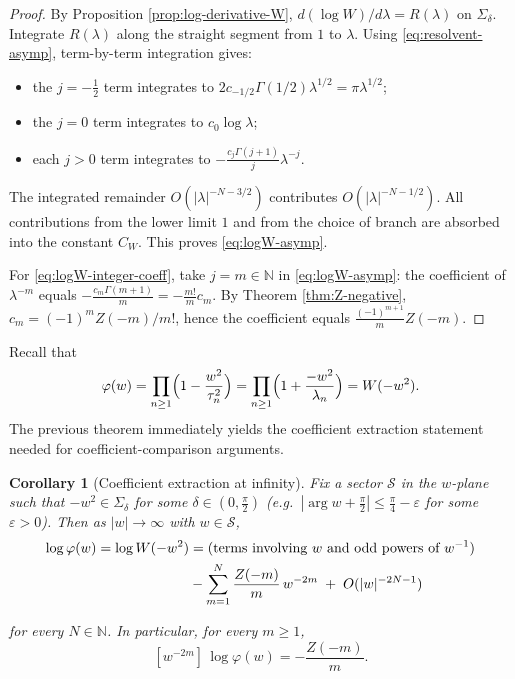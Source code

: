 \documentclass[11pt,letterpaper]{amsart}
\numberwithin{equation}{section}
\newtheorem{corollary}[theorem]{Corollary}
\theoremstyle{definition}
\newcommand{\N}{\mathbb{N}}
\begin{document}
\begin{proof}
By Proposition \ref{prop:log-derivative-W}, $d(\log W)/d\lambda=R(\lambda)$ on $\Sigma_\delta$.
Integrate $R(\lambda)$ along the straight segment from $1$ to $\lambda$.
Using \eqref{eq:resolvent-asymp}, term-by-term integration gives:
\begin{itemize}[leftmargin=2.5em]
\item the $j=-\tfrac12$ term integrates to $2c_{-1/2}\Gamma(1/2)\lambda^{1/2}=\pi\lambda^{1/2}$;
\item the $j=0$ term integrates to $c_0\log\lambda$;
\item each $j>0$ term integrates to $-\frac{c_j\Gamma(j+1)}{j}\lambda^{-j}$.
\end{itemize}
The integrated remainder $O(|\lambda|^{-N-3/2})$ contributes $O(|\lambda|^{-N-1/2})$.
All contributions from the lower limit $1$ and from the choice of branch are absorbed into the constant $C_W$.
This proves \eqref{eq:logW-asymp}.

For \eqref{eq:logW-integer-coeff}, take $j=m\in\N$ in \eqref{eq:logW-asymp}:
the coefficient of $\lambda^{-m}$ equals $-\frac{c_m\Gamma(m+1)}{m}=-\frac{m!}{m}c_m$.
By Theorem \ref{thm:Z-negative}, $c_m=(-1)^m Z(-m)/m!$, hence the coefficient equals
$\frac{(-1)^{m+1}}{m}Z(-m)$.
\end{proof}


Recall that
\[
\varphi(w)=\prod_{n\ge 1}\Bigl(1-\frac{w^2}{\tau_n^2}\Bigr)=\prod_{n\ge 1}\Bigl(1+\frac{-w^2}{\lambda_n}\Bigr)=W(-w^2).
\]
The previous theorem immediately yields the coefficient extraction statement needed for coefficient-comparison arguments.

\begin{corollary}[Coefficient extraction at infinity]\label{cor:logphi-coeff}
Fix a sector $\mathcal{S}$ in the $w$-plane such that $-w^2\in\Sigma_\delta$ for some $\delta\in(0,\tfrac{\pi}{2})$
(e.g.\ $|\arg w+\tfrac{\pi}{2}|\le \tfrac{\pi}{4}-\varepsilon$ for some $\varepsilon>0$).
Then as $|w|\to\infty$ with $w\in\mathcal{S}$,
\begin{align*}
\log\varphi(w)=\log W(-w^2)
&= \textup{(terms involving $w$ and odd powers of $w^{-1}$)}\\
&-\sum_{m=1}^{N}\frac{Z(-m)}{m}\,w^{-2m} \;+\;O(|w|^{-2N-1})    
\end{align*}

for every $N\in\N$.
In particular, for every $m\ge 1$,
\begin{equation}\label{eq:logphi-evencoeff}
[w^{-2m}]\,\log\varphi(w)=-\frac{Z(-m)}{m}.
\end{equation}
\end{corollary}
\end{document}
